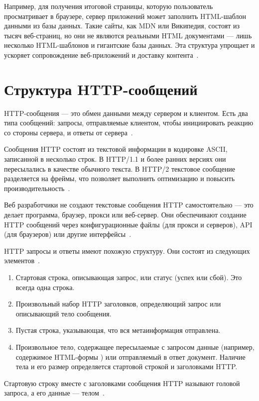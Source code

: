 \documentclass{bmstu}
\begin{document}
Например, для получения итоговой страницы, которую пользователь просматривает в браузере, сервер приложений может заполнить HTML-шаблон данными из базы данных. 
Такие сайты, как MDN или Википедия, состоят из тысяч веб-страниц, но они не являются реальными HTML документами --- лишь несколько HTML-шаблонов и гигантские базы данных. 
Эта структура упрощает и ускоряет сопровождение веб-приложений и доставку контента~\cite{MdnWebServer2023}.

\section{Структура HTTP-сообщений}

HTTP-сообщения --- это обмен данными между сервером и клиентом. 
Есть два типа сообщений: запросы, отправляемые клиентом, чтобы инициировать реакцию со стороны сервера, и ответы от сервера~\cite{MdnHttpMsg2023}.

Сообщения HTTP состоят из текстовой информации в кодировке ASCII, записанной в несколько строк. 
В HTTP/1.1 и более ранних версиях они пересылались в качестве обычного текста. 
В HTTP/2 текстовое сообщение разделяется на фреймы, что позволяет выполнить оптимизацию и повысить производительность~\cite{MdnHttpMsg2023}.

Веб разработчики не создают текстовые сообщения HTTP самостоятельно --- это делает программа, браузер, прокси или веб-сервер. 
Они обеспечивают создание HTTP сообщений через конфигурационные файлы (для прокси и серверов), API (для браузеров) или другие интерфейсы~\cite{MdnHttpMsg2023}.

HTTP запросы и ответы имеют похожую структуру. 
Они состоят из следующих элементов~\cite{MdnHttpMsg2023}.
\begin{enumerate}
\item Стартовая строка, описывающая запрос, или статус (успех или сбой). 
Это всегда одна строка.
\item Произвольный набор HTTP заголовков, определяющий запрос или описывающий тело сообщения.
\item Пустая строка, указывающая, что вся метаинформация отправлена.
\item Произвольное тело, содержащее пересылаемые с запросом данные (например, содержимое HTML-формы ) или отправляемый в ответ документ. 
Наличие тела и его размер определяется стартовой строкой и заголовками HTTP.
\end{enumerate}

Стартовую строку вместе с заголовками сообщения HTTP называют головой запроса, а его данные --- телом~\cite{MdnHttpMsg2023}.
\end{document}
